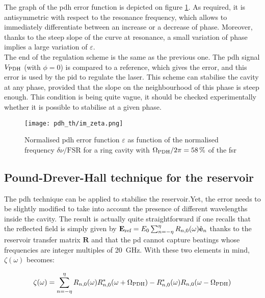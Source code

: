 The graph of the \gls{pdh} error function is depicted on figure \ref{im_zeta}. As required, it is antisymmetric with respect to the resonance frequency, which allows to immediately differentiate between an increase or a decrease of phase. Moreover, thanks to the steep slope of the curve at resonance, a small variation of phase implies a large variation of $\varepsilon$.\\

The end of the regulation scheme is the same as the previous one. The \gls{pdh} signal $V_{\text{PDH}}$ (with $\phi=0$) is compared to a reference, which gives the error, and this error is used by the \gls{pid} to regulate the laser. This scheme can stabilise the cavity at any phase, provided that the slope on the neighbourhood of this phase is steep enough. This condition is being quite vague, it should be checked experimentally whether it is possible to stabilise at a given phase.\\

\begin{figure}
	\centering
	\texttt{[image: pdh\_th/im\_zeta.png]}
	\caption{Normalised \gls{pdh} error function $\varepsilon$ as function of the normalised frequency $\delta \nu /\text{FSR}$ for a ring cavity with $\Omega_{\text{PDH}}/2\pi=\SI{58}{\percent}$ of the \gls{fsr}}
	\label{im_zeta}
\end{figure}


\subsection{Pound-Drever-Hall technique for the reservoir}

The \gls{pdh} technique can be applied to stabilise the reservoir.Yet, the error needs to be slightly modified to take into account the presence of different wavelengths inside the cavity. The result is actually quite straightforward if one recalls that the reflected field is simply given by $\mathbf{E}_{\text{ref}} = E_0 \sum_{n=-\eta}^\eta R_{n,0}(\omega) \hat{\mathbf{e}}_n$ thanks to the reservoir transfer matrix $\mathbf{R}$ and that the \gls{pd} cannot capture beatings whose frequencies are integer multiples of \SI{20}{\giga\hertz}. With these two elements in mind, $\zeta(\omega)$ becomes:

\begin{equation}
	\zeta(\omega) = \sum_{n=-\eta}^\eta R_{n,0}(\omega)R_{n,0}^*(\omega+\Omega_{\text{PDH}}) - R_{n,0}^*(\omega) R_{n,0}(\omega - \Omega_{\text{PDH}})
\end{equation}

